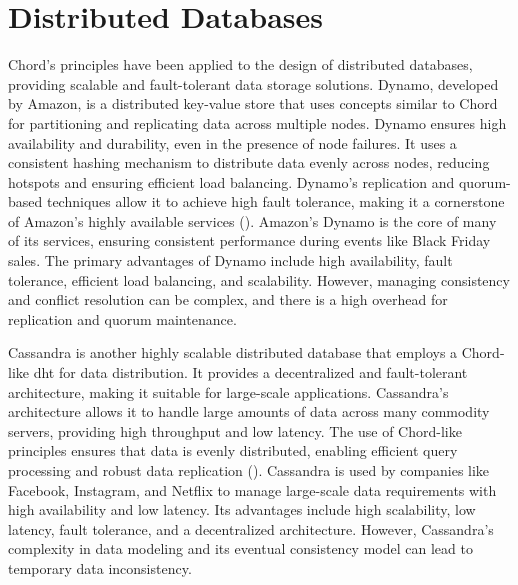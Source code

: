 \section{Distributed Databases}
Chord's principles have been applied to the design of distributed databases, providing scalable and fault-tolerant data storage solutions.
Dynamo, developed by Amazon, is a distributed key-value store that uses concepts similar to Chord for partitioning and replicating data across multiple nodes.
Dynamo ensures high availability and durability, even in the presence of node failures.
It uses a consistent hashing mechanism to distribute data evenly across nodes, reducing hotspots and ensuring efficient load balancing.
Dynamo's replication and quorum-based techniques allow it to achieve high fault tolerance, making it a cornerstone of Amazon's highly available services (\cite{DeCandia2007}).
Amazon's Dynamo is the core of many of its services, ensuring consistent performance during events like Black Friday sales.
The primary advantages of Dynamo include high availability, fault tolerance, efficient load balancing, and scalability.
However, managing consistency and conflict resolution can be complex, and there is a high overhead for replication and quorum maintenance.

Cassandra is another highly scalable distributed database that employs a Chord-like \gls{dht} for data distribution.
It provides a decentralized and fault-tolerant architecture, making it suitable for large-scale applications.
Cassandra's architecture allows it to handle large amounts of data across many commodity servers, providing high throughput and low latency.
The use of Chord-like principles ensures that data is evenly distributed, enabling efficient query processing and robust data replication (\cite{Lakshman2010}).
Cassandra is used by companies like Facebook, Instagram, and Netflix to manage large-scale data requirements with high availability and low latency.
Its advantages include high scalability, low latency, fault tolerance, and a decentralized architecture.
However, Cassandra's complexity in data modeling and its eventual consistency model can lead to temporary data inconsistency.

